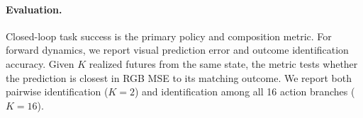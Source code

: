 
\paragraph{Evaluation.}
Closed-loop task success is the primary policy and composition metric.
For forward dynamics, we report visual prediction error and outcome
identification accuracy. Given $K$ realized futures from the same state,
the metric tests whether the prediction is closest in RGB MSE to its
matching outcome. We report both pairwise identification ($K=2$) and
identification among all 16 action branches ($K=16$).


